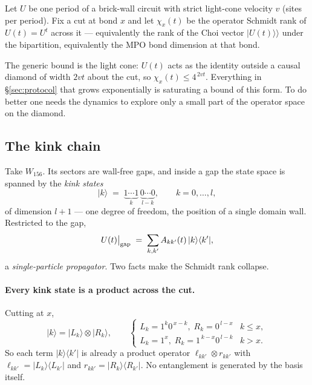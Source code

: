 \documentclass[11pt]{article}
\theoremstyle{plain}
\theoremstyle{remark}
\begin{document}
Let $U$ be one period of a brick-wall circuit with strict light-cone velocity
$v$ (sites per period). Fix a cut at bond $x$ and let $\chi_x(t)$ be the
operator Schmidt rank of $U(t) = U^t$ across it --- equivalently the rank of the
Choi vector $|U(t)\rangle\rangle$ under the bipartition, equivalently the MPO
bond dimension at that bond.

The generic bound is the light cone: $U(t)$ acts as the identity outside a
causal diamond of width $2vt$ about the cut, so
$\chi_x(t) \le 4^{\,2vt}$. Everything in \S\ref{sec:protocol} that grows
exponentially is saturating a bound of this form. To do better one needs the
dynamics to explore only a small part of the operator space on the diamond.

\subsection{The kink chain}

Take $W_{156}$. Its sectors are wall-free gaps, and inside a gap the state space
is spanned by the \emph{kink states}
\[
  |k\rangle \;=\; \underbrace{1\cdots1}_{k}\,\underbrace{0\cdots0}_{l-k},
  \qquad k = 0,\dots,l,
\]
of dimension $l+1$ --- one degree of freedom, the position of a single domain
wall. Restricted to the gap,
\[
  U(t)\big|_{\rm gap} \;=\; \sum_{k,k'} A_{kk'}(t)\, |k\rangle\langle k'| ,
\]
a \emph{single-particle propagator}. Two facts make the Schmidt rank collapse.

\paragraph{Every kink state is a product across the cut.} Cutting at $x$,
\[
  |k\rangle = |L_k\rangle \otimes |R_k\rangle,
  \qquad
  \begin{cases}
    L_k = 1^k0^{\,x-k}, \; R_k = 0^{\,l-x} & k \le x,\\
    L_k = 1^{x}, \; R_k = 1^{\,k-x}0^{\,l-k} & k > x .
  \end{cases}
\]
So each term $|k\rangle\langle k'|$ is already a product operator
$\ell_{kk'}\otimes r_{kk'}$ with
$\ell_{kk'} = |L_k\rangle\langle L_{k'}|$ and
$r_{kk'} = |R_k\rangle\langle R_{k'}|$. No entanglement is generated by the
basis itself.
\end{document}
